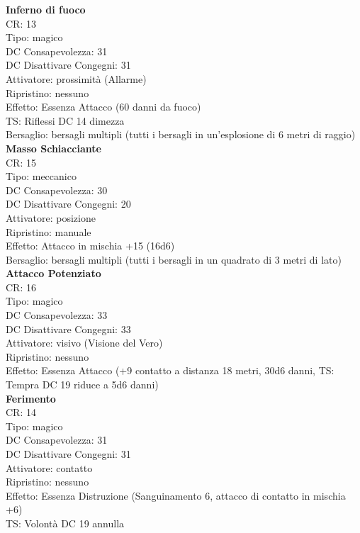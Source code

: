 \documentclass[a4paper,11pt,twoside,openany]{book}
\begin{document}
\begin{multicols}{2}
	\textbf{Inferno di fuoco}\\
	CR: 13 \\
	Tipo: magico \\
	DC Consapevolezza: 31 \\
	DC Disattivare Congegni: 31 \\
	Attivatore: prossimità (Allarme) \\
	Ripristino: nessuno \\
	Effetto: Essenza Attacco (60 danni da fuoco) \\
	TS: Riflessi DC 14 dimezza \\
	Bersaglio: bersagli multipli (tutti i bersagli in un’esplosione di 6 metri di raggio)\\

	\textbf{Masso Schiacciante}\\
	CR: 15 \\
	Tipo: meccanico \\
	DC Consapevolezza: 30 \\
	DC Disattivare Congegni: 20 \\
	Attivatore: posizione \\
	Ripristino: manuale \\
	Effetto: Attacco in mischia +15 (16d6) \\
	Bersaglio: bersagli multipli (tutti i bersagli in un quadrato di 3 metri di lato)\\

	\textbf{Attacco Potenziato}\\
	CR: 16 \\
	Tipo: magico \\
	DC Consapevolezza: 33 \\
	DC Disattivare Congegni: 33 \\
	Attivatore: visivo (Visione del Vero) \\
	Ripristino: nessuno \\
	Effetto: Essenza Attacco (+9 contatto a distanza 18 metri, 30d6 danni, TS: Tempra DC 19 riduce a 5d6 danni)\\

	\textbf{Ferimento}\\
	CR: 14 \\
	Tipo: magico \\
	DC Consapevolezza: 31 \\
	DC Disattivare Congegni: 31 \\
	Attivatore: contatto \\
	Ripristino: nessuno \\
	Effetto: Essenza Distruzione (Sanguinamento 6, attacco di contatto in mischia +6)\\
	TS: Volontà DC 19 annulla\\


\end{multicols}
\end{document}
